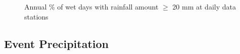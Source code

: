 \begin{figure}[htbp]

  \caption{Annual \% of wet days with rainfall amount $\geq$ 20 mm at
daily data stations}
  \label{fig:FF_annual_R20p}
\end{figure}

\subsection{Event Precipitation}
\label{sec:EventRainfallData}

